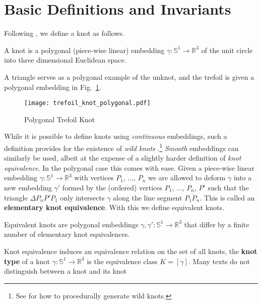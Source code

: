 \section{Basic Definitions and Invariants}
    Following \cite[p.~15]{LivingstonKnotTheory}, we define a knot as follows.
    \begin{definition}
        A knot is a polygonal (piece-wise linear) embedding
        $\gamma:\mathbb{S}^{1}\rightarrow\mathbb{R}^{3}$ of the unit circle
        into three dimensional Euclidean space.
    \end{definition}
    A triangle serves as a polygonal example of the unknot, and the trefoil is
    given a polygonal embedding in Fig.~\ref{fig:trefoil_knot_polygonal}.
    \begin{figure}
        \centering
        \texttt{[image: trefoil\_knot\_polygonal.pdf]}
        \caption{Polygonal Trefoil Knot}
        \label{fig:trefoil_knot_polygonal}
    \end{figure}
    While it is possible to define knots using \textit{continuous} embeddings,
    such a definition provides for the existence of
    \textit{wild knots} \cite{FoxArtinWildKnots1948}.\footnote{%
        See \cite{BrowneWildKnots} for how to procedurally generate wild knots.
    }
    \textit{Smooth} embeddings can similarly be used, albeit at the expense of
    a slightly harder definition of \textit{knot equivalence}. In the polygonal
    case this comes with ease. Given a piece-wise linear embedding
    $\gamma:\mathbb{S}^{1}\rightarrow\mathbb{R}^{3}$ with vertices
    $P_{1},\,\dots,\,P_{n}$ we are allowed to deform $\gamma$ into a new
    embedding $\gamma'$ formed by the (ordered) vertices
    $P_{1},\,\dots,\,P_{n},\,P'$
    such that the triangle $\Delta{P}_{n}P'P_{1}$ only intersects $\gamma$
    along the line segment $\overline{P_{1}P_{n}}$. This is called an
    \textbf{elementary knot equivalence}. With this we define equivalent knots.
    \begin{definition}
        Equivalent knots are polygonal embeddings
        $\gamma,\gamma':\mathbb{S}^{1}\rightarrow\mathbb{R}^{3}$ that differ by
        a finite number of elementary knot equivalences.
    \end{definition}
    Knot equivalence induces an equivalence relation on the set of all knots,
    the \textbf{knot type} of a knot
    $\gamma:\mathbb{S}^{1}\rightarrow\mathbb{R}^{3}$ is the equivalence class
    $K=[\gamma]$. Many texts do not distinguish between a knot and its knot
